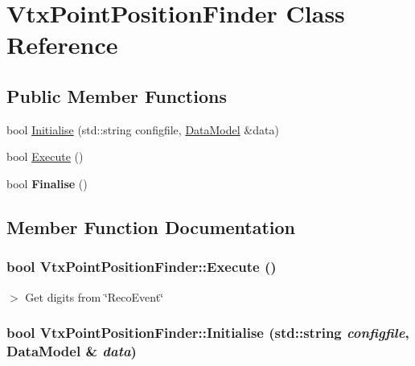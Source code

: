 \hypertarget{classVtxPointPositionFinder}{
\section{VtxPointPositionFinder Class Reference}
\label{classVtxPointPositionFinder}
}
\subsection*{Public Member Functions}
\begin{DoxyCompactItemize}
\item 
bool \hyperlink{classVtxPointPositionFinder_ab0115f74f010c3e26e090deb52723588}{Initialise} (std::string configfile, \hyperlink{classDataModel}{DataModel} \&data)
\item 
bool \hyperlink{classVtxPointPositionFinder_abc134ec88b75db5673009ac0a94509f7}{Execute} ()
\item 
\hypertarget{classVtxPointPositionFinder_ac3430701c487e4cd16f208b20439cec2}{
bool {\bfseries Finalise} ()}
\label{classVtxPointPositionFinder_ac3430701c487e4cd16f208b20439cec2}

\end{DoxyCompactItemize}


\subsection{Member Function Documentation}
\hypertarget{classVtxPointPositionFinder_abc134ec88b75db5673009ac0a94509f7}{
\subsubsection[{Execute}]{\setlength{\rightskip}{0pt plus 5cm}bool VtxPointPositionFinder::Execute ()}}
\label{classVtxPointPositionFinder_abc134ec88b75db5673009ac0a94509f7}


$>$ Get digits from \char`\"{}RecoEvent\char`\"{} \hypertarget{classVtxPointPositionFinder_ab0115f74f010c3e26e090deb52723588}{
\subsubsection[{Initialise}]{\setlength{\rightskip}{0pt plus 5cm}bool VtxPointPositionFinder::Initialise (std::string {\em configfile}, \/  {\bf DataModel} \& {\em data})}}
\label{classVtxPointPositionFinder_ab0115f74f010c3e26e090deb52723588}


